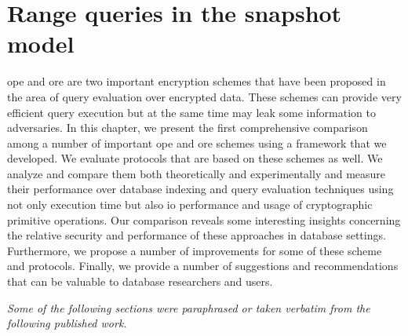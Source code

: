 \chapter{Range queries in the snapshot model}\label{section:range-snapshot}
\thispagestyle{myheadings}

	\acrfull{ope} and \acrfull{ore} are two important encryption schemes that have been proposed in the area of query evaluation over encrypted data.
	These schemes can provide very efficient query execution but at the same time may leak some information to adversaries.
	In this chapter, we present the first comprehensive comparison among a number of important \acrshort{ope} and \acrshort{ore} schemes using a framework that we developed.
	We evaluate protocols that are based on these schemes as well.
	We analyze and compare them both theoretically and experimentally and measure their performance over database indexing and query evaluation techniques using not only execution time but also \acrshort{io} performance and usage of cryptographic primitive operations.
	Our comparison reveals some interesting insights concerning the relative security and performance of these approaches in database settings.
	Furthermore, we propose a number of improvements for some of these scheme and protocols.
	Finally, we provide a number of suggestions and recommendations that can be valuable to database researchers and users.

	\emph{Some of the following sections were paraphrased or taken verbatim from the following published work.}

	\cite{ore-benchmark-17} 

	

	

	

	

	
